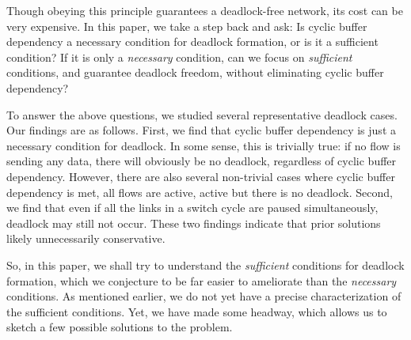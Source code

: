 Though obeying this principle guarantees a deadlock-free network, its cost can
be very expensive. In this paper, we take a step back and ask: Is cyclic buffer
dependency a necessary condition for deadlock formation, or is it a sufficient
condition? If it is only a {\em necessary} condition, can we focus on {\em
sufficient} conditions, and guarantee deadlock freedom, without  eliminating
cyclic buffer dependency?

To answer the above questions, we studied several representative deadlock cases.
Our findings are as follows. First, we find that cyclic buffer dependency is
just a necessary condition for deadlock. In some sense, this is trivially true:
if no flow is sending any data, there will obviously be no deadlock, regardless
of cyclic buffer dependency.  However, there are also several non-trivial cases
where cyclic buffer dependency is met, all flows are active, active but there is
no deadlock.  Second, we find that even if all the links in a switch cycle are
paused simultaneously, deadlock may still not occur.  These two findings
indicate that prior solutions likely unnecessarily conservative. 

So, in this paper, we shall try to understand the {\em sufficient} conditions
for deadlock formation, which we conjecture to be far easier to ameliorate than
the {\em necessary} conditions. As mentioned earlier, we do not yet have a precise
characterization of the sufficient conditions. Yet, we have made some headway,
which allows us to sketch a few possible solutions to the problem.

